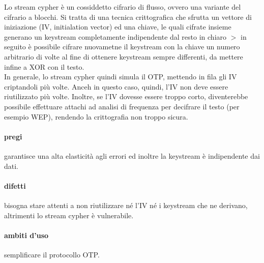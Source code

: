 \documentclass{article}
\begin{document}
Lo stream cypher è un cossiddetto cifrario di flusso, ovvero una variante del
cifrario a blocchi. Si tratta di una tecnica crittografica che sfrutta un
vettore di iniziazione (IV, initialation vector) ed una chiave, le quali cifrate
insieme generano un keystream completamente indipendente dal resto in chiaro $>$
in seguito è possibile cifrare nuovametne il keystream con la chiave un numero
arbitrario di volte al fine di ottenere keystream sempre differenti, da mettere
infine a XOR con il testo.\\
In generale, lo stream cypher quindi simula il OTP, mettendo in fila gli IV
criptandoli più volte. Anceh in questo caso, quindi, l'IV non deve essere
riutilizzato più volte. Inoltre, se l'IV dovesse essere troppo corto,
diventerebbe possibile effettuare attachi ad analisi di frequenza per decifrare
il testo (per esempio WEP), rendendo la crittografia non troppo sicura.

\paragraph{pregi} garantisce una alta elasticità agli errori ed inoltre la
keystream è indipendente dai dati.

\paragraph{difetti} bisogna stare attenti a non riutilizzare né l'IV né i
keystream che ne derivano, altrimenti lo stream cypher è vulnerabile.

\paragraph{ambiti d'uso} semplificare il protocollo OTP.
\end{document}
